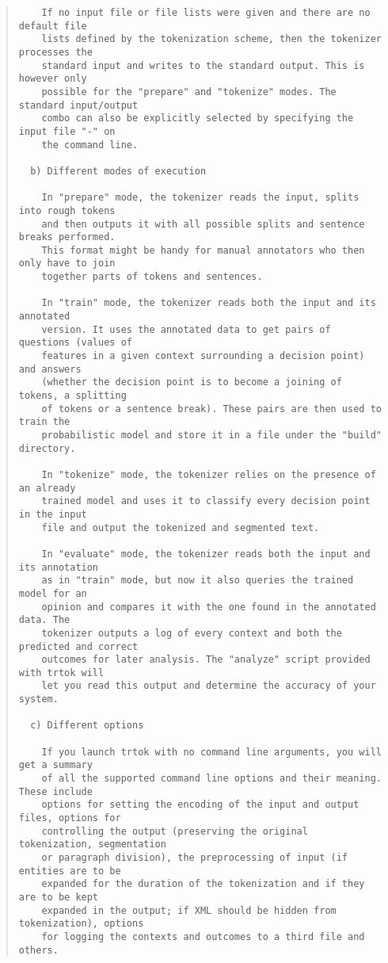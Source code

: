 \begin{scriptsize}
\begin{quote}
\begin{verbatim}
    If no input file or file lists were given and there are no default file
    lists defined by the tokenization scheme, then the tokenizer processes the
    standard input and writes to the standard output. This is however only
    possible for the "prepare" and "tokenize" modes. The standard input/output
    combo can also be explicitly selected by specifying the input file "-" on
    the command line.

  b) Different modes of execution

    In "prepare" mode, the tokenizer reads the input, splits into rough tokens
    and then outputs it with all possible splits and sentence breaks performed.
    This format might be handy for manual annotators who then only have to join
    together parts of tokens and sentences.

    In "train" mode, the tokenizer reads both the input and its annotated
    version. It uses the annotated data to get pairs of questions (values of
    features in a given context surrounding a decision point) and answers
    (whether the decision point is to become a joining of tokens, a splitting
    of tokens or a sentence break). These pairs are then used to train the
    probabilistic model and store it in a file under the "build" directory.

    In "tokenize" mode, the tokenizer relies on the presence of an already
    trained model and uses it to classify every decision point in the input
    file and output the tokenized and segmented text.

    In "evaluate" mode, the tokenizer reads both the input and its annotation
    as in "train" mode, but now it also queries the trained model for an
    opinion and compares it with the one found in the annotated data. The
    tokenizer outputs a log of every context and both the predicted and correct
    outcomes for later analysis. The "analyze" script provided with trtok will
    let you read this output and determine the accuracy of your system.

  c) Different options

    If you launch trtok with no command line arguments, you will get a summary
    of all the supported command line options and their meaning. These include
    options for setting the encoding of the input and output files, options for
    controlling the output (preserving the original tokenization, segmentation
    or paragraph division), the preprocessing of input (if entities are to be
    expanded for the duration of the tokenization and if they are to be kept
    expanded in the output; if XML should be hidden from tokenization), options
    for logging the contexts and outcomes to a third file and others.
\end{verbatim}
\end{quote}
\end{scriptsize}
